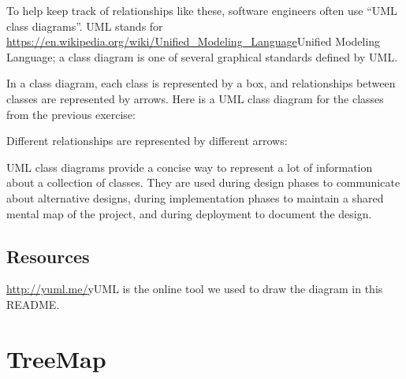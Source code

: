 \documentclass[12pt]{book}
\theoremstyle{exercise}
\newcommand{\java}{\verb}%}
\begin{document}
To help keep track of relationships like these, software engineers often
use ``UML class diagrams''. UML stands for
\url{https://en.wikipedia.org/wiki/Unified_Modeling_Language}{Unified
Modeling Language}; a class diagram is one of several graphical
standards defined by UML.

In a class diagram, each class is represented by a box, and
relationships between classes are represented by arrows. Here is a UML
class diagram for the classes from the previous exercise:


Different relationships are represented by different arrows:


UML class diagrams provide a concise way to represent a lot of
information about a collection of classes. They are used during design
phases to communicate about alternative designs, during implementation
phases to maintain a shared mental map of the project, and during
deployment to document the design.

\section{Resources}\label{resources-10}

\url{http://yuml.me/}{yUML} is the online tool we used to draw the
diagram in this README. 

\chapter{TreeMap}
\end{document}

